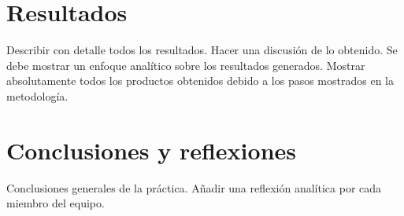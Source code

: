 \documentclass[sigconf]{acmart}
\begin{document}
\section{Resultados}
Describir con detalle todos los resultados. Hacer una discusión de lo obtenido.
Se debe mostrar un enfoque analítico sobre los resultados generados. Mostrar 
absolutamente todos los productos obtenidos debido a los pasos mostrados en la 
metodología.

\section{Conclusiones y reflexiones}
Conclusiones generales de la práctica. Añadir una reflexión analítica por cada 
miembro del equipo.



\end{document}

